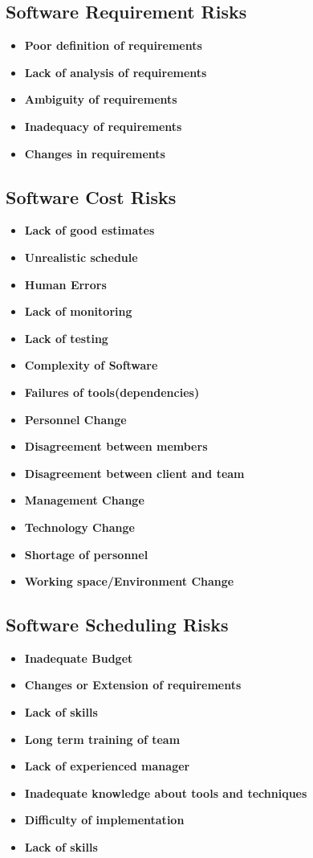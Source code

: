 \documentclass{article}
\begin{document}
\subsection{Software Requirement Risks}
\begin{itemize}
    \item \textbf{Poor definition of requirements}
    \item \textbf{Lack of analysis of requirements}
    \item \textbf{Ambiguity of requirements}
    \item \textbf{Inadequacy of requirements}
    \item \textbf{Changes in requirements}
\end{itemize}
\subsection{Software Cost Risks}
\begin{itemize}
    \item \textbf{Lack of good estimates}
    \item \textbf{Unrealistic schedule}
    \item \textbf{Human Errors}
    \item \textbf{Lack of monitoring}
    \item \textbf{Lack of testing}
    \item \textbf{Complexity of Software}
    \item \textbf{Failures of tools(dependencies)}
    \item \textbf{Personnel Change}
    \item \textbf{Disagreement between members}
    \item \textbf{Disagreement between client and team}
    \item \textbf{Management Change}
    \item \textbf{Technology Change}
    \item \textbf{Shortage of personnel}
    \item \textbf{Working space/Environment Change}
\end{itemize}
\subsection{Software Scheduling Risks}
\begin{itemize}
    \item \textbf{Inadequate Budget}
    \item \textbf{Changes or Extension of requirements}
    \item \textbf{Lack of skills}
    \item \textbf{Long term training of team}
    \item \textbf{Lack of experienced manager}
    \item \textbf{Inadequate knowledge about tools and techniques}
    \item \textbf{Difficulty of implementation}
    \item \textbf{Lack of skills}
\end{itemize}
\end{document}
